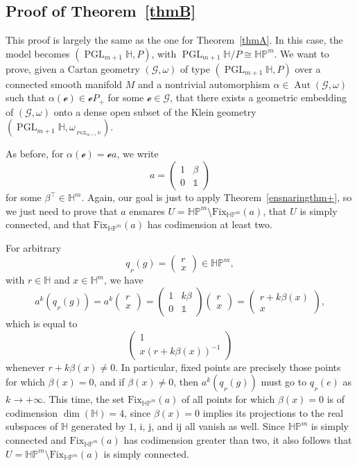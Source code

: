 \documentclass[pdftex]{sigma}
\numberwithin{equation}{section}
\theoremstyle{definition}
\DeclareMathOperator{\Aut}{\mathrm{Aut}}
\DeclareMathOperator{\PGL}{\mathrm{PGL}}
\newcommand{\MC}[1]{\omega_{{}_{#1}}}
\begin{document}
\subsection{Proof of Theorem~\ref{thmB}}
This proof is largely the same as the one for Theorem~\ref{thmA}. In this case, the model becomes $(\PGL_{m+1}\mathbb{H},P)$, with $\PGL_{m+1}\mathbb{H}/P\cong\mathbb{HP}^m$. We want to prove, given a Cartan geometry $(\mathscr{G},\omega)$ of type $(\PGL_{m+1}\mathbb{H},P)$ over a connected smooth manifold $M$ and a nontrivial automorphism $\alpha\in\Aut(\mathscr{G},\omega)$ such that $\alpha(\mathscr{e})\in\mathscr{e}P_+$ for some $\mathscr{e}\in\mathscr{G}$, that there exists a geometric embedding of $(\mathscr{G},\omega)$ onto a dense open subset of the Klein geometry $(\PGL_{m+1}\mathbb{H},\MC{\PGL_{m+1}\mathbb{H}})$.

As before, for $\alpha(\mathscr{e})=\mathscr{e}a$, we write \[a=\begin{pmatrix}1 & \beta \\ 0 & \mathds{1}\end{pmatrix}\] for some $\beta^\top\in\mathbb{H}^m$. Again, our goal is just to apply Theorem~\ref{ensnaringthm+}, so we just need to prove that $a$ ensnares $U=\mathbb{HP}^m\setminus\mathrm{Fix}_{\mathbb{HP}^m}(a)$, that $U$ is simply connected, and that $\mathrm{Fix}_{\mathbb{HP}^m}(a)$ has codimension at least two.

For arbitrary \[q_{{}_P}(g)=\begin{pmatrix}r \\ x\end{pmatrix}\in\mathbb{HP}^m,\] with $r\in\mathbb{H}$ and $x\in\mathbb{H}^m$, we have \[a^k(q_{{}_P}(g))=a^k\begin{pmatrix}r \\ x\end{pmatrix}=\begin{pmatrix}1 & k\beta \\ 0 & \mathds{1}\end{pmatrix}\begin{pmatrix}r \\ x\end{pmatrix}=\begin{pmatrix}r+k\beta(x) \\ x\end{pmatrix},\] which is equal to \[\begin{pmatrix}1 \\ x(r+k\beta(x))^{-1}\end{pmatrix}\] whenever $r+k\beta(x)\neq 0$. In particular, fixed points are precisely those points for which $\beta(x)=0$, and if $\beta(x)\neq 0$, then $a^k(q_{{}_P}(g))$ must go to $q_{{}_P}(e)$ as $k\rightarrow +\infty$. This time, the set $\mathrm{Fix}_{\mathbb{HP}^m}(a)$ of all points for which $\beta(x)=0$ is of codimension $\dim(\mathbb{H})=4$, since $\beta(x)=0$ implies its projections to the real subspaces of $\mathbb{H}$ generated by $1$, $\mathrm{i}$, $\mathrm{j}$, and $\mathrm{i}\mathrm{j}$ all vanish as well. Since $\mathbb{HP}^m$ is simply connected and $\mathrm{Fix}_{\mathbb{HP}^m}(a)$ has codimension greater than two, it also follows that $U=\mathbb{HP}^m\setminus\mathrm{Fix}_{\mathbb{HP}^m}(a)$ is simply connected.
\end{document}
